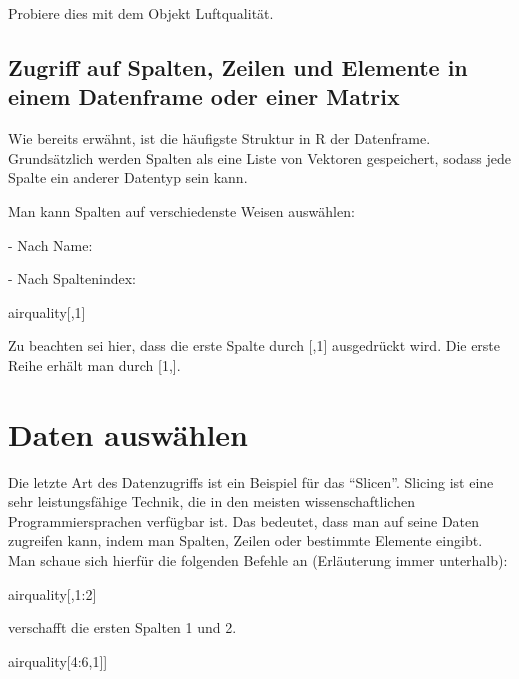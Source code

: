 \documentclass[a4paper,twoside]{tufte-book}\usepackage[]{graphicx}\usepackage[]{color}
\begin{document}
\begin{appendices}
Probiere dies mit dem Objekt Luftqualität.

\subsection{Zugriff auf Spalten, Zeilen und Elemente in einem Datenframe oder einer Matrix}

Wie bereits erwähnt, ist die häufigste Struktur in R der Datenframe. Grundsätzlich werden Spalten als eine Liste von Vektoren gespeichert, sodass jede Spalte ein anderer Datentyp sein kann.

Man kann Spalten auf verschiedenste Weisen auswählen:

- Nach Name:
\begin{Schunk}
\end{Schunk}

- Nach Spaltenindex: 

\begin{Schunk}
\begin{Sinput}
airquality[,1]
\end{Sinput}
\end{Schunk}

Zu beachten sei hier, dass die erste Spalte durch [,1] ausgedrückt wird. Die erste Reihe erhält man durch [1,].

\section{Daten auswählen}

Die letzte Art des Datenzugriffs ist ein Beispiel für das "`Slicen"'. Slicing ist eine sehr leistungsfähige Technik, die in den meisten wissenschaftlichen Programmiersprachen verfügbar ist. Das bedeutet, dass man auf seine Daten zugreifen kann, indem man Spalten, Zeilen oder bestimmte Elemente eingibt. Man schaue sich hierfür die folgenden Befehle an (Erläuterung immer unterhalb):

\begin{Schunk}
\begin{Sinput}
airquality[,1:2]
\end{Sinput}
\end{Schunk}

verschafft die ersten Spalten 1 und 2.


\begin{Schunk}
\begin{Sinput}
airquality[4:6,1]]
\end{Sinput}
\end{Schunk}


\end{appendices}
\end{document}
